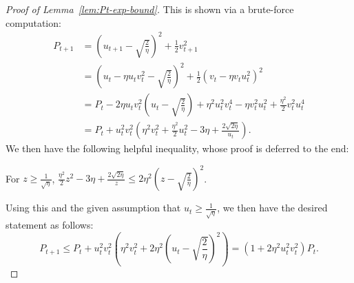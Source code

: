 \begin{proof}[Proof of Lemma~\ref{lem:Pt-exp-bound}]
    This is shown via a brute-force computation:
    \begin{align*}
        P_{t+1} &= \left( u_{t+1} - \sqrt{\frac{2}{\eta}} \right)^2 + \frac{1}{2} v_{t+1}^2 \\
        &= \left( u_t - \eta u_t v_t^2 - \sqrt{\frac{2}{\eta}} \right)^2 + \frac{1}{2} \left( v_t - \eta v_t u_t^2 \right)^2 \tag{GD update} \\
        &= P_t - 2\eta u_t v_t^2 \left(u_t - \sqrt{\frac{2}{\eta}}\right) + \eta^2 u_t^2 v_t^4 - \eta v_t^2 u_t^2 + \frac{\eta^2}{2} v_t^2 u_t^4 \\
        &= P_t + u_t^2 v_t^2 \left( \eta^2 v_t^2 + \frac{\eta^2}{2} u_t^2 - 3\eta + \frac{2\sqrt{2\eta}}{u_t} \right).
    \end{align*}
    We then have the following helpful inequality, whose proof is deferred to the end:
    \begin{lemma}
    \label{lem:inequality}
        For $z \geq \frac{1}{\sqrt{\eta}}$, $\frac{\eta^2}{2} z^2 - 3\eta + \frac{2\sqrt{2\eta}}{z} \leq 2\eta^2 \left( z - \sqrt{\frac{2}{\eta}} \right)^2$.
    \end{lemma}
    Using this and the given assumption that $u_t \geq \frac{1}{\sqrt{\eta}}$, we then have the desired statement as follows:
    \begin{equation*}
        P_{t+1} \leq P_t + u_t^2 v_t^2 \left( \eta^2 v_t^2 + 2\eta^2 \left( u_t - \sqrt{\frac{2}{\eta}} \right)^2 \right)
        = (1 + 2 \eta^2 u_t^2 v_t^2) P_t.
    \end{equation*}
\end{proof}
